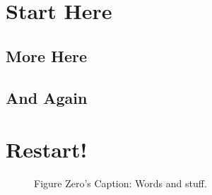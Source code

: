 \section{Start Here}
\lipsum[2]

\subsection{More Here}
\lipsum[3]

\subsection{And Again}
\lipsum[4]

\section{Restart!}

\begin{figure}
\caption[Figure Zero]{Figure Zero's Caption: Words and stuff.}
\end{figure}
